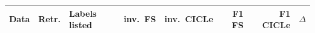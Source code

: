 \begin{tabular}{lllrrrrc}
\toprule
Data & Retr. & Labels listed & inv.\ FS & inv.\ CICLe & F1 FS & F1 CICLe & $\Delta$ \\
\midrule
\bottomrule
\end{tabular}
